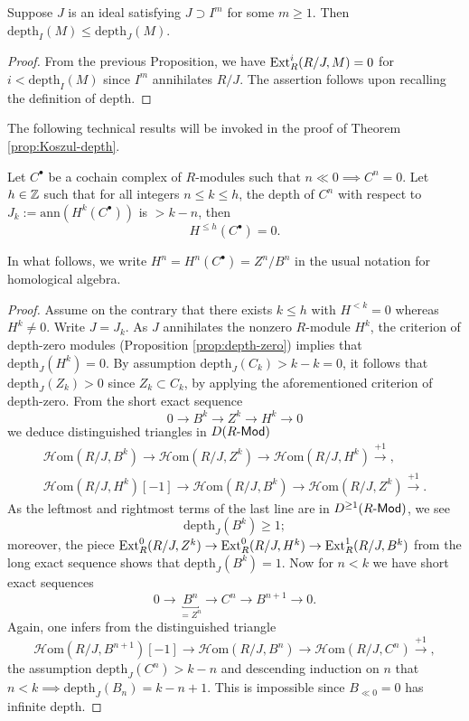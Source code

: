 \begin{lemma}\label{prop:depth-power}
	Suppose $J$ is an ideal satisfying $J \supset I^m$ for some $m \geq 1$. Then $\mathrm{depth}_I(M) \leq \mathrm{depth}_J(M)$.
\end{lemma}
\begin{proof}
	From the previous Proposition, we have $\operatorname{Ext}^i_R(R/J, M) = 0$ for $i < \text{depth}_I(M)$ since $I^m$ annihilates $R/J$. The assertion follows upon recalling the definition of depth.
\end{proof}

The following technical results will be invoked in the proof of Theorem \ref{prop:Koszul-depth}.
\begin{proposition}\label{prop:depth-vanishing-aux}
	Let $C^\bullet$ be a cochain complex of $R$-modules such that $n \ll 0 \implies C^n = 0$. Let $h \in \mathbb{Z}$  such that for all integers $n \leq k \leq h$, the depth of $C^n$ with respect to $J_k := \mathrm{ann}(H^k(C^\bullet))$ is $> k-n$, then
	\[ H^{\leq h}(C^\bullet)=0. \]
\end{proposition}
In what follows, we write $H^n = H^n(C^\bullet) = Z^n/B^n$ in the usual notation for homological algebra.
\begin{proof}
	Assume on the contrary that there exists $k \leq h$ with $H^{< k} = 0$ whereas $H^k \neq 0$. Write $J = J_k$. As $J$ annihilates the nonzero $R$-module $H^k$, the criterion of depth-zero modules (Proposition \ref{prop:depth-zero}) implies that $\text{depth}_J(H^k) = 0$. By assumption $\text{depth}_J(C_k) > k-k = 0$, it follows that $\text{depth}_J(Z_k) > 0$ since $Z_k \subset C_k$, by applying the aforementioned criterion of depth-zero. From the short exact sequence
	\[ 0 \to B^k \to Z^k \to H^k \to 0 \]
	we deduce distinguished triangles in $D(R\text{-}\mathsf{Mod})$
	\begin{gather*}
		\mathcal{H}\text{om}(R/J, B^k) \to \mathcal{H}\text{om}(R/J, Z^k) \to \mathcal{H}\text{om}(R/J, H^k) \xrightarrow{+1}, \\
		\mathcal{H}\text{om}(R/J, H^k)[-1] \to \mathcal{H}\text{om}(R/J, B^k) \to \mathcal{H}\text{om}(R/J, Z^k) \xrightarrow{+1}.
	\end{gather*}
	As the leftmost and rightmost terms of the last line are in $D^{\geq 1}(R\text{-}\mathsf{Mod})$, we see
	\[ \text{depth}_J(B^k) \geq 1; \]
	moreover, the piece $\operatorname{Ext}_R^0(R/J, Z^k) \to \operatorname{Ext}_R^0(R/J, H^k) \to \operatorname{Ext}_R^1(R/J, B^k)$ from the long exact sequence shows that $\text{depth}_J(B^k) = 1$. Now for $n < k$ we have short exact sequences
	\[ 0 \to \underbracket{B^n}_{= Z^n} \to C^n \to B^{n+1} \to 0. \]
	Again, one infers from the distinguished triangle
	\[ \mathcal{H}\text{om}(R/J, B^{n+1})[-1] \to \mathcal{H}\text{om}(R/J, B^n) \to \mathcal{H}\text{om}(R/J, C^n) \xrightarrow{+1} , \]
	the assumption $\text{depth}_J(C^n) > k-n$ and descending induction on $n$ that $n < k \implies \text{depth}_J(B_n) = k-n+1$. This is impossible since $B_{\ll 0} = 0$ has infinite depth.
\end{proof}

